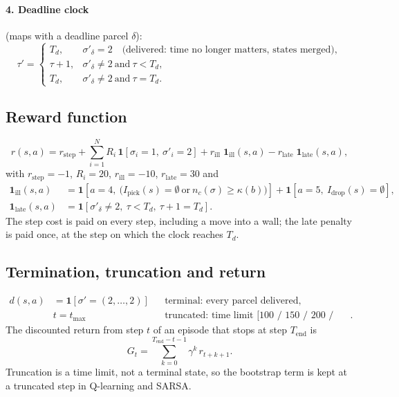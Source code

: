 \documentclass[11pt]{article}
\newcommand{\ind}[1]{\mathbf{1}\!\left[#1\right]}
\begin{document}
\paragraph{4. Deadline clock} (maps with a deadline parcel $\delta$):
\begin{equation}
\tau'=\begin{cases}T_d, & \sigma'_\delta=2 \quad\text{(delivered: time no longer matters, states merged)},\\ \tau+1, & \sigma'_\delta\neq2\ \text{and}\ \tau<T_d,\\ T_d, & \sigma'_\delta\neq2\ \text{and}\ \tau=T_d .\end{cases}
\end{equation}

\subsection{Reward function}
\begin{equation}
r(s,a)= r_{\mathrm{step}}
+\sum_{i=1}^{N}R_i\,\ind{\sigma_i=1,\ \sigma'_i=2}
+ r_{\mathrm{ill}}\;\mathbf{1}_{\mathrm{ill}}(s,a)
- r_{\mathrm{late}}\;\mathbf{1}_{\mathrm{late}}(s,a),
\end{equation}
with $r_{\mathrm{step}}=-1$, $R_i=20$, $r_{\mathrm{ill}}=-10$, $r_{\mathrm{late}}=30$ and
\begin{align}
\mathbf{1}_{\mathrm{ill}}(s,a) &= \ind{a=4,\ \big(I_{\mathrm{pick}}(s)=\emptyset\ \text{or}\ n_c(\sigma)\ge\kappa(b)\big)}
+\ind{a=5,\ I_{\mathrm{drop}}(s)=\emptyset},\\
\mathbf{1}_{\mathrm{late}}(s,a) &= \ind{\sigma'_\delta\neq2,\ \tau<T_d,\ \tau+1=T_d}.
\end{align}
The step cost is paid on every step, including a move into a wall; the late penalty is paid once, at the step on which the clock reaches $T_d$.

\subsection{Termination, truncation and return}
\begin{align}
d(s,a) &= \ind{\sigma'=(2,\dots,2)} && \text{terminal: every parcel delivered},\\
&t = t_{\max} && \text{truncated: time limit [100 / 150 / 200 / 300 for S1--S4]}.
\end{align}
The discounted return from step $t$ of an episode that stops at step $T_{\mathrm{end}}$ is
\begin{equation}
G_t=\sum_{k=0}^{T_{\mathrm{end}}-t-1}\gamma^{k}\,r_{t+k+1}.
\end{equation}
Truncation is a time limit, not a terminal state, so the bootstrap term is kept at a truncated step in Q-learning and SARSA.
\end{document}
